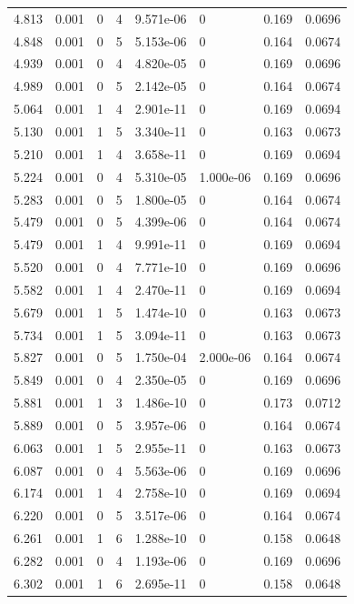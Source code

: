 \documentclass[preview]{standalone}
\begin{document}
{{{\begin{tabular}{L{1.2cm}C{1.2cm} C{0.3cm}C{0.5cm} C{1.4cm}C{1.4cm} C{1.4cm}C{1.4cm}}
  4.813  &  0.001  & 0     &  4 &  9.571e-06  & 0  & 0.169 &  0.0696   \\ 
  4.848  &  0.001  & 0     &  5 &  5.153e-06  & 0  & 0.164 &  0.0674   \\ 
  4.939  &  0.001  & 0     &  4 &  4.820e-05  & 0  & 0.169 &  0.0696   \\ 
  4.989  &  0.001  & 0     &  5 &  2.142e-05  & 0  & 0.164 &  0.0674   \\ 
  5.064  &  0.001  & 1     &  4 &  2.901e-11  & 0  & 0.169 &  0.0694   \\ 
  5.130  &  0.001  & 1     &  5 &  3.340e-11  & 0  & 0.163 &  0.0673   \\ 
  5.210  &  0.001  & 1     &  4 &  3.658e-11  & 0  & 0.169 &  0.0694   \\ 
  5.224  &  0.001  & 0     &  4 &  5.310e-05  & 1.000e-06  & 0.169 &  0.0696   \\ 
  5.283  &  0.001  & 0     &  5 &  1.800e-05  & 0  & 0.164 &  0.0674   \\ 
  5.479  &  0.001  & 0     &  5 &  4.399e-06  & 0  & 0.164 &  0.0674   \\ 
  5.479  &  0.001  & 1     &  4 &  9.991e-11  & 0  & 0.169 &  0.0694   \\ 
  5.520  &  0.001  & 0     &  4 &  7.771e-10  & 0  & 0.169 &  0.0696   \\ 
  5.582  &  0.001  & 1     &  4 &  2.470e-11  & 0  & 0.169 &  0.0694   \\ 
  5.679  &  0.001  & 1     &  5 &  1.474e-10  & 0  & 0.163 &  0.0673   \\ 
  5.734  &  0.001  & 1     &  5 &  3.094e-11  & 0  & 0.163 &  0.0673   \\ 
  5.827  &  0.001  & 0     &  5 &  1.750e-04  & 2.000e-06  & 0.164 &  0.0674   \\ 
  5.849  &  0.001  & 0     &  4 &  2.350e-05  & 0  & 0.169 &  0.0696   \\ 
  5.881  &  0.001  & 1     &  3 &  1.486e-10  & 0  & 0.173 &  0.0712   \\ 
  5.889  &  0.001  & 0     &  5 &  3.957e-06  & 0  & 0.164 &  0.0674   \\ 
  6.063  &  0.001  & 1     &  5 &  2.955e-11  & 0  & 0.163 &  0.0673   \\ 
  6.087  &  0.001  & 0     &  4 &  5.563e-06  & 0  & 0.169 &  0.0696   \\ 
  6.174  &  0.001  & 1     &  4 &  2.758e-10  & 0  & 0.169 &  0.0694   \\ 
  6.220  &  0.001  & 0     &  5 &  3.517e-06  & 0  & 0.164 &  0.0674   \\ 
  6.261  &  0.001  & 1     &  6 &  1.288e-10  & 0  & 0.158 &  0.0648   \\ 
  6.282  &  0.001  & 0     &  4 &  1.193e-06  & 0  & 0.169 &  0.0696   \\ 
  6.302  &  0.001  & 1     &  6 &  2.695e-11  & 0  & 0.158 &  0.0648   \\ 
\hline 
\end{tabular} 

}}}
\end{document}
